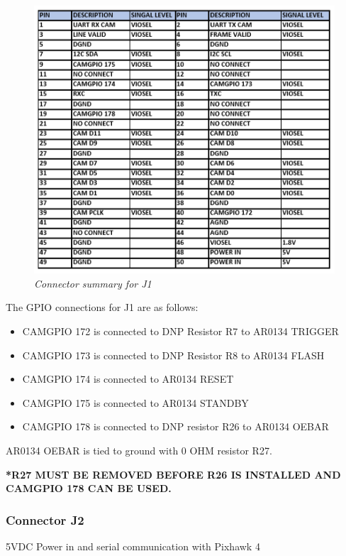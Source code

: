 \documentclass[11pt]{article}
\begin{document}
    \begin{figure}[H]
	\centering	
	\includegraphics[width=6 in]{CONN_J1}
	\caption{\textit{Connector summary for J1}}	
	\end{figure}

 The GPIO connections for J1 are as follows:

\begin{itemize}

\item CAMGPIO 172 is connected to DNP Resistor R7 to AR0134 TRIGGER
\item CAMGPIO 173  is connected to DNP Resistor R8 to AR0134 FLASH
\item CAMGPIO 174  is connected to AR0134 RESET
\item CAMGPIO 175  is connected to AR0134 STANDBY
\item CAMGPIO 178 is connected to DNP resistor R26 to AR0134 OEBAR
\end{itemize}

AR0134 OEBAR is tied to ground with 0 OHM resistor R27.

\textbf{*R27  MUST BE REMOVED BEFORE R26 IS INSTALLED AND CAMGPIO 178 CAN BE USED.}

\subsubsection{Connector J2}
5VDC Power in and serial communication with Pixhawk 4
\end{document}
